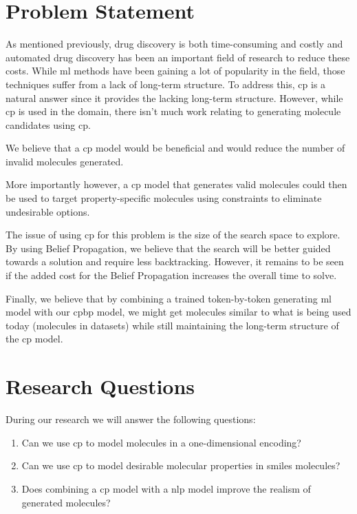 \documentclass[../Document.tex]{subfiles}
\begin{document}



\section{Problem Statement}
\label{sec:intro/problem}

As mentioned previously, drug discovery is both time-consuming and costly and automated drug discovery has been an important field of research to reduce these costs.
While \gls{ml} methods have been gaining a lot of popularity in the field, those techniques suffer from a lack of long-term structure.
To address this, \gls{cp} is a natural answer since it provides the lacking long-term structure.
However, while \gls{cp} is used in the domain, there isn't much work  relating to generating molecule candidates using \gls{cp}.

We believe that a \gls{cp} model would be beneficial and would reduce the number of invalid molecules generated.

More importantly however, a \gls{cp} model that generates valid molecules could then be used to target property-specific molecules using constraints to eliminate undesirable options.

The issue of using \gls{cp} for this problem is the size of the search space to explore. By using Belief Propagation, we believe that the search will be better guided towards a solution and require less backtracking. However, it remains to be seen if the added cost for the Belief Propagation increases the overall time to solve.

Finally, we believe that by combining a trained token-by-token generating \gls{ml} model with our \gls{cpbp} model, we might get molecules similar to what is being used today (molecules in datasets) while still maintaining the long-term structure of the \gls{cp} model.


\section{Research Questions}
\label{sec:intro/questions}
During our research we will answer the following questions:

\begin{enumerate}
    \item Can we use \acrshort{cp} to model molecules in a one-dimensional encoding?
    \item Can we use \acrshort{cp} to model desirable molecular properties in \acrshort{smiles} molecules?
    \item Does combining a \acrshort{cp} model with a \acrshort{nlp} model improve the realism of generated molecules?
\end{enumerate}
\end{document}
